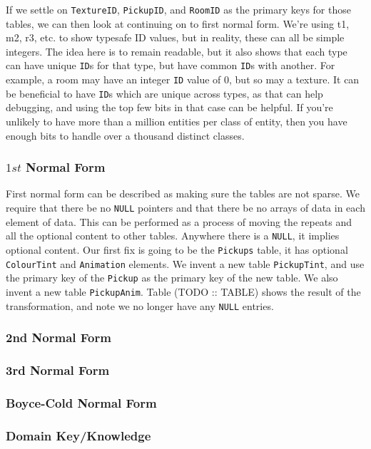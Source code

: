 \documentclass[a4paper,12pt]{book}
\begin{document}
If we settle on \texttt{TextureID}, \texttt{PickupID}, and \texttt{RoomID} as the primary keys for those tables, we can then look at continuing on to first normal form.
We're using t1, m2, r3, etc. to show typesafe ID values, but in reality, these can all be simple integers.
The idea here is to remain readable, but it also shows that each type can have unique \texttt{ID}s for that type, but have common \texttt{ID}s with another.
For example, a room may have an integer \texttt{ID} value of 0, but so may a texture.
It can be beneficial to have \texttt{ID}s which are unique across types, as that can help debugging, and using the top few bits in that case can be helpful.
If you're unlikely to have more than a million entities per class of entity, then you have enough bits to handle over a thousand distinct classes.

\subsubsection{$1st$ Normal Form}

First normal form can be described as making sure the tables are not sparse.
We require that there be no \texttt{NULL} pointers and that there be no arrays of data in each element of data.
This can be performed as a process of moving the repeats and all the optional content to other tables.
Anywhere there is a \texttt{NULL}, it implies optional content.
Our first fix is going to be the \texttt{Pickups} table, it has optional \texttt{ColourTint} and \texttt{Animation} elements.
We invent a new table \texttt{PickupTint}, and use the primary key of the \texttt{Pickup} as the primary key of the new table.
We also invent a new table \texttt{PickupAnim}.
Table (TODO :: TABLE) shows the result of the transformation, and note we no longer have any \texttt{NULL} entries.

\subsubsection{2nd Normal Form}
\subsubsection{3rd Normal Form}
\subsubsection{Boyce-Cold Normal Form}
\subsubsection{Domain Key/Knowledge}
\end{document}
